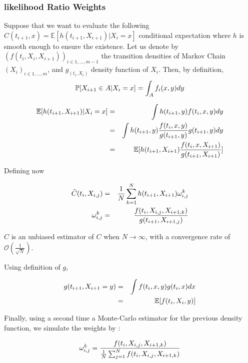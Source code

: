 \documentclass[english,11pt,openany]{article}
\theoremstyle{definition}
\theoremstyle{plain}
\theoremstyle{definition}
\begin{document}
	\subsubsection{likelihood Ratio Weights}
	
	Suppose that we want to evaluate the following $C(t_{i+1}, x) = \mathbb{E}[h(t_{i+1},X_{i+1})| X_i = x]$ conditional expectation where $h$ is smooth enough to ensure the existence. 
	Let us denote by $(f(t_i, X_i, X_{i+1}))_{i \in {1, ..., m-1}}$ the transition densities of Markov Chain $(X_i)_{i \in {1, ..., m}}$, and $g_(t_i, X_i)$ density function of $X_i$. 
	Then, by definition, 
	\begin{equation}
	\mathbb{P}[X_{i+1} \in A|X_i=x] = \int_{A}^{}f_i(x, y)dy  \notag
	\end{equation}
	
	\begin{eqnarray}
	\mathbb{E}[h(t_{i+1},X_{i+1})|X_i = x] &=& \int h(t_{i+1},y) f(t_i, x, y)dy \notag \\
	&=& \int h(t_{i+1},y)  \frac{f(t_i, x, y)}{g(t_{i+1}, y)}g(t_{i+1}, y)dy \notag \\
	&=& \mathbb{E}[h(t_{i+1},X_{i+1})  \frac{f(t_i, x, X_{i+1})}{g(t_{i+1}, X_{i+1})}]
	\end{eqnarray}
	
	Defining now 
	
	\begin{eqnarray}
	\hat{C}(t_i, X_{i,j}) &=& \frac{1}{N} \sum_{k=1}^{N} h(t_{i+1},X_{i+1}) \omega_{i,j}^k \notag \\
	\omega_{i,j}^k & = &\frac{f(t_i, X_{i, j}, X_{i+1, k})}{g(t_{i+1}, X_{i+1, j})} \notag
	\end{eqnarray} 
	
	$\widehat{C}$ is an unbiased estimator of $C$ when $N\rightarrow \infty$, with a convergence rate of $\mathcal{O}(\frac{1}{\sqrt{N}})$. 
	
	Using definition of $g$, 
	
	\begin{eqnarray}
	g(t_{i+1}, X_{i+1}=y) &=& \int f(t_i, x, y) g(t_i, x)dx \notag \\
	&=& \mathbb{E}[f(t_i, X_i, y)]
	\end{eqnarray}
	
	Finally, using a second time a Monte-Carlo estimator for the previous density function, we simulate the weights by : 
	
	\begin{equation}
	\omega_{i,j}^k =  \frac{f(t_i, X_{i, j}, X_{i+1, k})}{\frac{1}{N} \sum_{j=1}^{N}f(t_i, X_{i, j}, X_{i+1,k})} \notag
	\end{equation}
	
\end{document}
